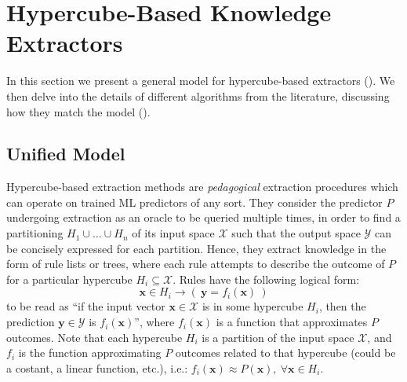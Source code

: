 \documentclass[
]{ceurart}
\begin{document}
\section{Hypercube-Based Knowledge Extractors}

In this section we present a general model for hypercube-based extractors ().
%
We then delve into the details of different algorithms from the literature, discussing how they match the model ().

\subsection{Unified Model}

Hypercube-based extraction methods are \emph{pedagogical} extraction procedures which can operate on trained ML predictors of any sort.
%
They consider the predictor $P$ undergoing extraction as an oracle to be queried multiple times, in order to find a partitioning $H_1 \cup \ldots \cup H_n$ of its input space $\mathcal{X}$ such that the output space $\mathcal{Y}$ can be concisely %
expressed for each partition.
%
Hence, they extract knowledge in the form of rule lists or trees, where each rule attempts to describe the outcome of $P$ for a particular hypercube $H_i \subseteq \mathcal{X}$. 
%
Rules have the following logical form: 
%
\[ \mathbf{x} \in H_i \rightarrow (~\mathbf{y} = f_i(\mathbf{x})~) \]  
%
to be read as ``if the input vector $\mathbf{x} \in \mathcal{X}$ is in some hypercube $H_i$, then the prediction $\mathbf{y} \in \mathcal{Y}$ is $f_i(\mathbf{x})$'', where $f_i(\mathbf{x})$ is a function that approximates $P$ outcomes.
%
Note that each hypercube $H_i$ is a partition of the input space $\mathcal{X}$, and $f_i$ is the function approximating $P$ outcomes related to that hypercube (could be a costant, a linear function, etc.), i.e.: $f_i(\mathbf{x}) \approx P(\mathbf{x}),~\forall \mathbf{x} \in H_i$.
\end{document}
